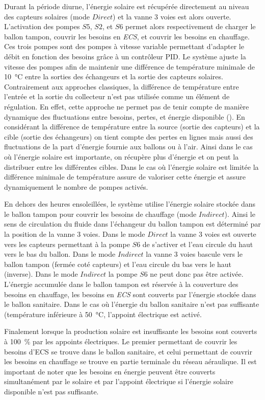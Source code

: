 Durant la période diurne, l’énergie solaire est récupérée directement au niveau des
capteurs solaires (mode $Direct$) et la vanne 3 voies est alors ouverte. L’activation des
pompes $S5$, $S2$, et $S6$ permet alors respectivement de charger le ballon tampon,
couvrir les besoins en \emph{ECS}, et couvrir les besoins en chauffage. Ces trois pompes
sont des pompes à vitesse variable permettant d’adapter le débit en fonction des besoins
grâce à un contrôleur PID. Le système ajuste la vitesse des pompes afin de maintenir une
différence de température minimale de \SI{10}{\celsius} entre la sorties des échangeurs et
la sortie des capteurs solaires. Contrairement aux approches classiques, la différence de
température entre l’entrée et la sortie du collecteur n’est pas utilisée comme un élément
de régulation. En effet, cette approche ne permet pas de tenir compte de manière dynamique
des fluctuations entre besoins, pertes, et énergie disponible ().
En considérant la différence de température entre la source (sortie des capteurs) et la
cible (sortie des échangeurs) on tient compte des pertes en lignes mais aussi des
fluctuations de la part d’énergie fournie aux ballons ou à l’air. Ainsi dans le cas où
l’énergie solaire est importante, on récupère plus d’énergie et on peut la distribuer
entre les différentes cibles. Dans le cas où l’énergie solaire est limitée la différence
minimale de température assure de valoriser cette énergie et assure dynamiquement le
nombre de pompes activés.

En dehors des heures ensoleillées, le système utilise l’énergie solaire stockée dans le
ballon tampon pour couvrir les besoins de chauffage (mode $Indirect$). Ainsi le sens de
circulation du fluide dans l’échangeur du ballon tampon est déterminé par la position de
la vanne 3 voies. Dans le mode $Direct$ la vanne 3 voies est ouverte vers les capteurs
permettant à la pompe $S6$ de s’activer et l’eau circule du haut vers le bas du ballon.
Dans le mode $Indirect$ la vanne 3 voies bascule vers le ballon tampon (fermée coté
capteurs) et l’eau circule du bas vers le haut (inverse). Dans le mode $Indirect$ la pompe
$S6$ ne peut donc pas être activée. L’énergie accumulée dans le ballon tampon est réservée
à la couverture des besoins en chauffage, les besoins en \emph{ECS} sont couverts par
l’énergie stockée dans le ballon sanitaire. Dans le cas où l’énergie du ballon sanitaire
n’est pas suffisante (température inférieure à \SI{50}{\celsius}, l’appoint électrique est
activé.

Finalement lorsque la production solaire est insuffisante les besoins sont couverts à
\SI{100}{\percent} par les appoints électriques. Le premier permettant de couvrir les
besoins d’ECS se trouve dans le ballon sanitaire, et celui permettant de couvrir les
besoins en chauffage se trouve en partie terminale du réseau aéraulique. Il est important
de noter que les besoins en énergie peuvent être couverts simultanément par
le solaire et par l’appoint électrique si l’énergie solaire disponible n’est pas
suffisante.

